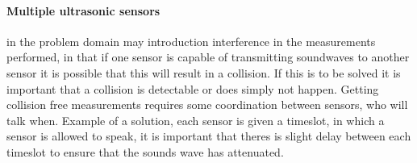\paragraph{Multiple ultrasonic sensors} in the problem domain may introduction interference in the measurements performed, in that if one sensor is capable of transmitting soundwaves to another sensor it is possible that this will result in a collision. If this is to be solved it is important that a collision is detectable or does simply not happen. Getting collision free measurements requires some coordination between sensors, who will talk when. Example of a solution, each sensor is given a timeslot, in which a sensor is allowed to speak, it is important that theres is slight delay between each timeslot to ensure that the sounds wave has attenuated.

